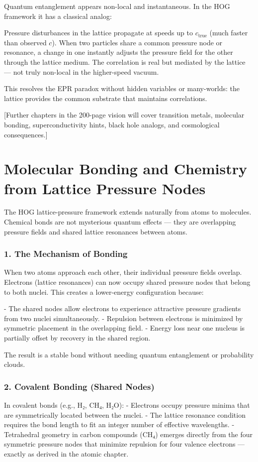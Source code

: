 \documentclass[11pt,a4paper]{book}
\begin{document}
{Quantum entanglement appears non-local and instantaneous. In the HOG framework it has a classical analog:

Pressure disturbances in the lattice propagate at speeds up to \( c_{\text{true}} \) (much faster than observed \( c \)). When two particles share a common pressure node or resonance, a change in one instantly adjusts the pressure field for the other through the lattice medium. The correlation is real but mediated by the lattice — not truly non-local in the higher-speed vacuum.

This resolves the EPR paradox without hidden variables or many-worlds: the lattice provides the common substrate that maintains correlations.

[Further chapters in the 200-page vision will cover transition metals, molecular bonding, superconductivity hints, black hole analogs, and cosmological consequences.]

\chapter{Molecular Bonding and Chemistry from Lattice Pressure Nodes}

The HOG lattice-pressure framework extends naturally from atoms to molecules. Chemical bonds are not mysterious quantum effects — they are overlapping pressure fields and shared lattice resonances between atoms.

\subsection{1. The Mechanism of Bonding}
When two atoms approach each other, their individual pressure fields overlap. Electrons (lattice resonances) can now occupy shared pressure nodes that belong to both nuclei. This creates a lower-energy configuration because:

- The shared nodes allow electrons to experience attractive pressure gradients from two nuclei simultaneously.
- Repulsion between electrons is minimized by symmetric placement in the overlapping field.
- Energy loss near one nucleus is partially offset by recovery in the shared region.

The result is a stable bond without needing quantum entanglement or probability clouds.

\subsection{2. Covalent Bonding (Shared Nodes)}
In covalent bonds (e.g., H₂, CH₄, H₂O):
- Electrons occupy pressure minima that are symmetrically located between the nuclei.
- The lattice resonance condition requires the bond length to fit an integer number of effective wavelengths.
- Tetrahedral geometry in carbon compounds (CH₄) emerges directly from the four symmetric pressure nodes that minimize repulsion for four valence electrons — exactly as derived in the atomic chapter.

}
\end{document}
